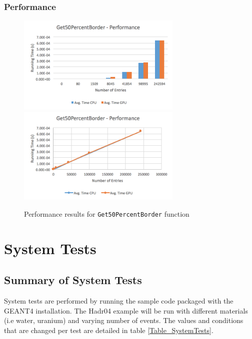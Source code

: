 \documentclass[12pt]{article}
\begin{document}
	\subsubsection{Performance}
		\begin{figure}[H]
    	\centering
    	\caption{Performance results for \texttt{Get50PercentBorder} function}\label{figPerformanceGet50Percent}
    	\includegraphics[width=0.7\textwidth]{get50_bar.png}
    	\includegraphics[width=0.7\textwidth]{get50_line.png}
    	\end{figure}

		
		
\section{System Tests} \label{System Tests}
\subsection{Summary of System Tests}
System tests are performed by running the sample code packaged with the GEANT4 installation. The Hadr04 example will be run with different materials (i.e water, uranium) and varying number of events. The values and conditions that are changed per test are detailed in table \ref{Table_SystemTests}.\\
\end{document}
